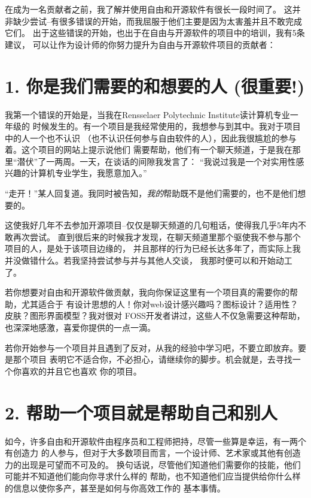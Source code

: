 

\noindent{}在成为一名贡献者之前，我了解并使用自由和开源软件有很长一段时间了。
这并非缺少尝试--有很多错误的开始，而我屈服于他们主要是因为太害羞并且不敢完成它们。
出于这些错误的开始，也出于在自由与开源软件的项目中的培训，我有5条建议，
可以让作为设计师的你努力提升为自由与开源软件项目的贡献者：

\section*{1. 你是我们需要的和想要的人 (很重要!)}
我第一个错误的开始是，当我在Rensselaer Polytechnic Institute读计算机专业一年级的
时候发生的。有一个项目是我经常使用的，我想参与到其中。我对于项目中的人一个也不认识
（也不认识任何参与自由软件的人），因此我很尴尬的参与着。这个项目的网站上提示说他们
需要帮助，他们有一个聊天频道，于是我在那里“潜伏”了一两周。一天，在谈话的间隙我发言了：
“我说过我是一个对实用性感兴趣的计算机专业学生，我愿意加入。”

“走开！”某人回复道。我同时被告知，\emph{我的}帮助既不是他们需要的，也不是他们想要的。

这使我好几年不去参加开源项目--仅仅是聊天频道的几句粗话，使得我几乎5年内不敢再次尝试。
直到很后来的时候我才发现，在聊天频道里那个驱使我不参与那个项目的人，是处于该项目边缘的，
并且那样的行为已经长达多年了，而实际上我并没做错什么。若我坚持尝试参与并与其他人交谈，
我那时便可以和开始动工了。

若你想要对自由和开源软件做贡献，我向你保证这里有一个项目真的需要你的帮助，尤其适合于
有设计思想的人！你对web设计感兴趣吗？图标设计？适用性？皮肤？图形界面模型？我对很对
FOSS开发者讲过，这些人不仅急需要这种帮助，也深深地感激，喜爱你提供的一点一滴。

若你开始参与一个项目并且遇到了反对，从我的经验中学习吧，不要立即放弃。要是那个项目
表明它不适合你，不必担心，请继续你的脚步。机会就是，去寻找一个你喜欢的并且它也喜欢
你的项目。

\section*{2. 帮助一个项目就是帮助自己和别人}
如今，许多自由和开源软件由程序员和工程师把持，尽管一些算是幸运，有一两个有创造力
的人参与，但对于大多数项目而言，一个设计师、艺术家或其他有创造力的出现是可望而不可及的。
换句话说，尽管他们知道他们需要你的技能，他们可能并不知道他们能向你寻求什么样的
帮助，也不知道他们应当提供给你什么样的信息以使你多产，甚至是如何与你高效工作的
基本事情。

